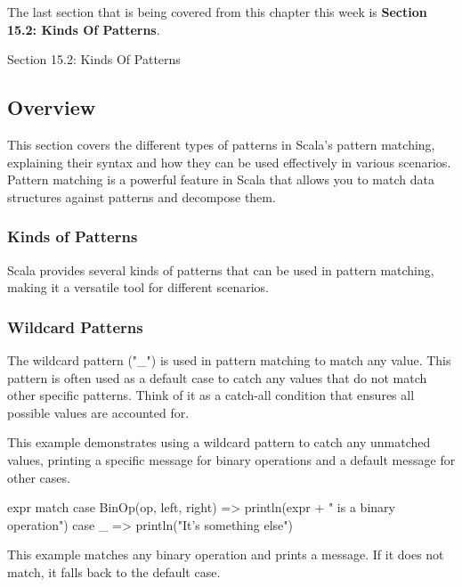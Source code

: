 The last section that is being covered from this chapter this week is \textbf{Section 15.2: Kinds Of Patterns}.

\begin{notes}{Section 15.2: Kinds Of Patterns}
    \subsection*{Overview}

    This section covers the different types of patterns in Scala's pattern matching, explaining their syntax and how they can be used effectively in various scenarios. Pattern matching is a powerful 
    feature in Scala that allows you to match data structures against patterns and decompose them.
    
    \subsubsection*{Kinds of Patterns}
    
    Scala provides several kinds of patterns that can be used in pattern matching, making it a versatile tool for different scenarios.
    
    \subsubsection*{Wildcard Patterns}
    
    The wildcard pattern ("\_") is used in pattern matching to match any value. This pattern is often used as a default case to catch any values that do not match other specific patterns. Think of it 
    as a catch-all condition that ensures all possible values are accounted for.
    
    \begin{highlight}
    
    This example demonstrates using a wildcard pattern to catch any unmatched values, printing a specific message for binary operations and a default message for other cases.
    
    \begin{code}[Scala]
    expr match {
        case BinOp(op, left, right) => println(expr + " is a binary operation")
        case _ => println("It's something else")
    }
    \end{code}
    
    This example matches any binary operation and prints a message. If it does not match, it falls back to the default case.
    

\end{highlight}
\end{notes}
